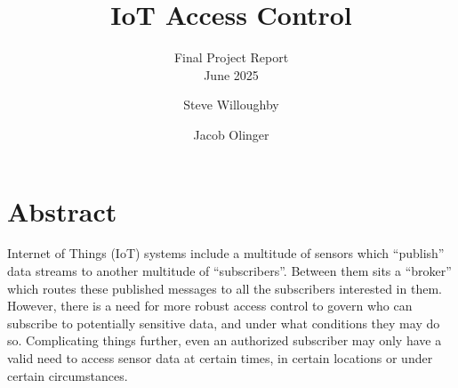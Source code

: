 \documentclass[sigconf, nonacm]{acmart}
\begin{document}
\title{IoT Access Control}
\subtitle{Final Project Report \\ June 2025}

\author{Steve Willoughby}
\author{Jacob Olinger}
\maketitle
\section{Abstract}
Internet of Things (IoT) systems include a multitude of sensors which ``publish''
data streams to another multitude of ``subscribers''. Between them sits a ``broker''
which routes these published messages to all the subscribers interested in them.
However, there is a need for more robust access control to govern who can
subscribe to potentially sensitive data, and under what conditions they may do so.
Complicating things further, even an authorized subscriber may only have a valid
need to access sensor data at certain times, in certain locations or under certain
circumstances.
\end{document}

